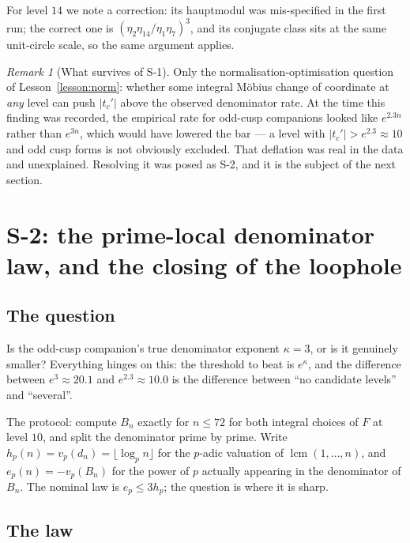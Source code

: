 \documentclass[11pt,reqno]{amsart}
\theoremstyle{plain}
\theoremstyle{definition}
\theoremstyle{remark}
\newtheorem{remark}[theorem]{Remark}
\newcommand{\dn}{d_n}
\newcommand{\tcp}{t_c'}
\begin{document}
For level $14$ we note a correction: its hauptmodul was mis-specified in
the first run; the correct one is $(\eta_2\eta_{14}/\eta_1\eta_7)^3$, and
its conjugate class sits at the same unit-circle scale, so the same
argument applies.

\begin{remark}[What survives of S-1]
Only the normalisation-optimisation question of
Lesson~\ref{lesson:norm}: whether some integral M\"obius change of
coordinate at \emph{any} level can push $|\tcp|$ above the observed
denominator rate. At the time this finding was recorded, the empirical
rate for odd-cusp companions looked like $e^{2.3n}$ rather than $e^{3n}$,
which would have lowered the bar --- a level with $|\tcp|>e^{2.3}\approx
10$ and odd cusp forms is not obviously excluded. That deflation was
real in the data and unexplained. Resolving it was posed as S-2, and it
is the subject of the next section.
\end{remark}

\section{S-2: the prime-local denominator law, and the closing of the loophole}
\label{sec:s2}

\subsection{The question}

Is the odd-cusp companion's true denominator exponent $\kappa=3$, or is
it genuinely smaller? Everything hinges on this: the threshold to beat is
$e^\kappa$, and the difference between $e^3\approx20.1$ and
$e^{2.3}\approx10.0$ is the difference between ``no candidate levels''
and ``several''.

The protocol: compute $B_n$ exactly for $n\le72$ for both integral
choices of $F$ at level $10$, and split the denominator prime by prime.
Write $h_p(n)=v_p(\dn)=\lfloor \log_p n\rfloor$ for the $p$-adic
valuation of $\operatorname{lcm}(1,\dots,n)$, and $e_p(n)=-v_p(B_n)$ for
the power of $p$ actually appearing in the denominator of $B_n$. The
nominal law is $e_p\le 3h_p$; the question is where it is sharp.

\subsection{The law}
\end{document}
